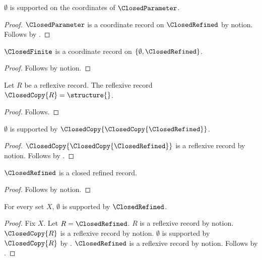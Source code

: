 \begin{proposition}\label{closed_parameter_guard_consumed}
    $\emptyset$ is supported on the coordinates of $\ClosedParameter$.
\end{proposition}
\begin{proof}
    $\ClosedParameter$ is a coordinate record on $\ClosedRefined$ by notion.
    Follows by .
\end{proof}

\begin{proposition}\label{closed_finite_notion}
    $\ClosedFinite$ is a coordinate record on $\{\emptyset,\ClosedRefined\}$.
\end{proposition}
\begin{proof}
    Follows by notion.
\end{proof}

\begin{construction}\label{closed_instance_copy}
    Let $R$ be a reflexive record.
    The reflexive record $\ClosedCopy{R}=\structure{}$.
\end{construction}
\begin{proof}
    Follows.
\end{proof}

\begin{proposition}\label{closed_instance_nested_guard}
    $\emptyset$ is supported by $\ClosedCopy{\ClosedCopy{\ClosedRefined}}$.
\end{proposition}
\begin{proof}
    $\ClosedCopy{\ClosedCopy{\ClosedRefined}}$ is a reflexive record by notion.
    Follows by .
\end{proof}

\begin{proposition}\label{closed_instance_notion}
    $\ClosedRefined$ is a closed refined record.
\end{proposition}
\begin{proof}
    Follows by notion.
\end{proof}

\begin{proposition}\label{closed_instance_local_alias}
    For every set $X$, $\emptyset$ is supported by $\ClosedRefined$.
\end{proposition}
\begin{proof}
    Fix $X$.
    Let $R=\ClosedRefined$.
    $R$ is a reflexive record by notion.
    $\ClosedCopy{R}$ is a reflexive record by notion.
    $\emptyset$ is supported by $\ClosedCopy{R}$ by .
    $\ClosedRefined$ is a reflexive record by notion.
    Follows by .
\end{proof}
